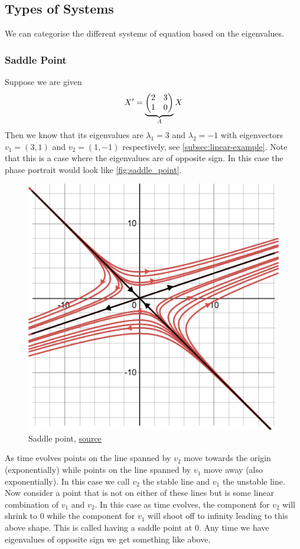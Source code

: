 \subsection{Types of Systems}
We can categorise the different systems of equation based on the eigenvalues.

\subsubsection{Saddle Point}
Suppose we are given 
\begin{equation}
    X' = \underbrace{\begin{pmatrix} 2 & 3\\1 & 0 \end{pmatrix}}_{A} X
\end{equation}
Then we know that its eigenvalues are $\lambda_1 = 3$ and $\lambda_2 = -1$ with eigenvectors $v_1 = (3, 1)$ and $v_2 = (1, -1)$ respectively, see \autoref{subsec:linear-example}. Note that this is a case where the eigenvalues are of opposite sign. In this case the phase portrait would look like \autoref{fig:saddle_point}.
\begin{figure}[ht]
    \centering
    \includegraphics[scale=0.35]{Images/saddle_point.png}
    \caption{Saddle point, \href{https://www.desmos.com/calculator/olr55ghiwv}{source}}
    \label{fig:saddle_point}
\end{figure}

As time evolves points on the line spanned by $v_2$ move towards the origin (exponentially) while points on the line spanned by $v_1$ move away (also exponentially). In this case we call $v_2$ the stable line and $v_1$ the unstable line. Now consider a point that is not on either of these lines but is some linear combination of $v_1$ and $v_2$. In this case as time evolves, the component for $v_2$ will shrink to 0 while the component for $v_1$ will shoot off to infinity leading to this above shape. This is called having a saddle point at 0. Any time we have eigenvalues of opposite sign we get something like above.

